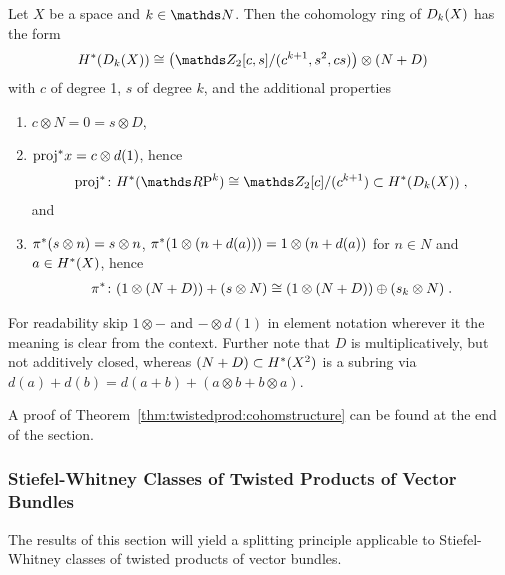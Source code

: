\begin{Thm}\label{thm:twistedprod:cohomstructure}
  Let $X$ be a space and $k\in\Nat$.
  Then the cohomology ring of $D_{k}({X})$ has the form
  \begin{align*}
    \H^*(\Twistedprod{k}{X})
    &\cong
      \left(
      \Zmod2[c,s]/(c^{k+1},s^2,cs)
      \right)
      \otimes (N+D)
  \end{align*}
  with $c$ of degree 1, $s$ of degree $k$, and the additional
  properties
  \begin{enumerate}
  \item $c\otimes N=0=s\otimes D$, 
  \item ${\mathrm{proj}}^* x = c\otimes d(1)$,
    hence
    \begin{gather*}
      \pb\proj\colon\H^*(\RP k)\cong
      \Zmod2[c]/(c^{k+1})\subset\H^*(\Twistedprod k X)
      \;,
    \end{gather*}
    and
  \item\label{item:twistedprodcohom:pi}
    ${\pi}^* (s\otimes n) = s\otimes n$,
    ${\pi}^* (1\otimes (n+d(a))) = 1\otimes (n+d(a))$
    for $n\in N$ and $a\in H^*(X)$,
    hence
    \begin{gather*}
      {\pi}^*\colon (1\otimes(N+D)) + (s\otimes N)
      \cong (1\otimes(N+D))\oplus (s_k\otimes N)
      \;.
    \end{gather*}
  \end{enumerate}
  For readability skip $1\otimes-$ and $-\otimes d(1)$ in element
  notation wherever it the meaning is clear from the context.
  Further note that $D$ is multiplicatively, but not additively closed,
  whereas $(N+D)\subset H^*(X^2)$ is a subring via
  $d(a)+d(b) = d(a+b)+(a\otimes b+ b\otimes a)$.
\end{Thm}
A proof of Theorem~\ref{thm:twistedprod:cohomstructure} can be found
at the end of the section.

\subsubsection[Stiefel-Whitney Classes]
{Stiefel-Whitney Classes of Twisted Products of Vector Bundles}
The results of this section will yield a splitting principle
applicable to Stiefel-Whitney classes of twisted products of vector
bundles.

